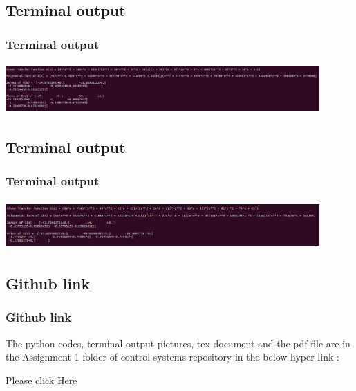 \documentclass{beamer}
\theoremstyle{remark}
\begin{document}
\subsection{Terminal output}
\begin{frame}
\frametitle{Terminal output }
\usepackage{}
\includegraphics[width=12cm,height=1.9cm]{Assignment 1/15a.png}
\end{frame}











\subsection{Terminal output}
\begin{frame}
\frametitle{Terminal output }
\usepackage{}
\includegraphics[width=12cm,height=1.9cm]{Assignment 1/15b.png}
\end{frame}










\subsection{Github link}
\begin{frame}
\frametitle{Github link}

The python codes, terminal output pictures, tex document and the pdf file are in the Assignment 1 folder of control systems repository in the below hyper link :\\
\vspace{0.2 in}

\href{https://github.com/KalepalliNVSDMAnanyan/control-systems}{Please click Here}







\end{frame}
\end{document}
